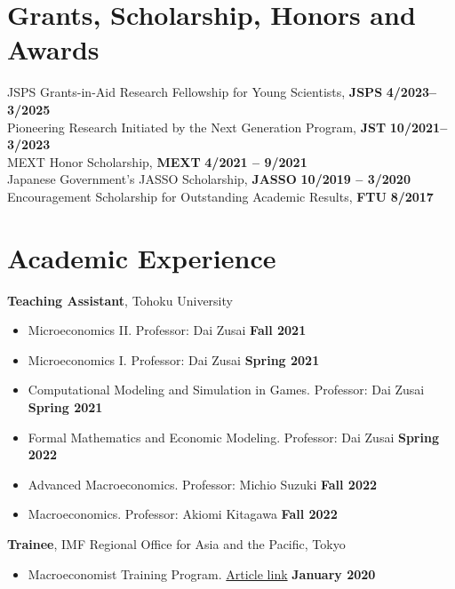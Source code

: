 \documentclass[margin,line]{res}
\begin{document}
\begin{resume}
\section{\sc Grants, Scholarship, Honors and Awards}
JSPS Grants-in-Aid Research Fellowship for Young Scientists, {\bf JSPS} \hfill {\bf 4/2023--3/2025}\\
Pioneering Research Initiated by the Next Generation Program, {\bf JST} \hfill {\bf 10/2021--3/2023}\\
MEXT Honor Scholarship, {\bf MEXT} \hfill {\bf 4/2021 -- 9/2021}\\
Japanese Government's JASSO Scholarship, {\bf JASSO} \hfill {\bf 10/2019 -- 3/2020}\\
Encouragement Scholarship for Outstanding Academic Results, {\bf FTU} \hfill {\bf 8/2017}\\

\vspace{4mm}

\section{\sc Academic Experience}
{\bf Teaching Assistant}, Tohoku University
\begin{itemize}
\item[ ] Microeconomics II. Professor: Dai Zusai \hfill {\bf Fall 2021}
\item[ ] Microeconomics I. Professor: Dai Zusai \hfill {\bf Spring 2021}
\item[ ] Computational Modeling and Simulation in Games. Professor: Dai Zusai \hfill {\bf Spring 2021}
\item[ ] Formal Mathematics and Economic Modeling. Professor: Dai Zusai \hfill {\bf Spring 2022}
\item[ ] Advanced Macroeconomics. Professor: Michio Suzuki \hfill {\bf Fall 2022}
\item[ ] Macroeconomics. Professor: Akiomi Kitagawa \hfill {\bf Fall 2022}
\end{itemize}

\vspace*{.05in}
{\bf Trainee}, IMF Regional Office for Asia and the Pacific, Tokyo
\vspace*{.05in}
\begin{itemize}
\item[ ] Macroeconomist Training Program. \href{https://www.imf.org/en/Countries/ResRep/OAP-Home/~/link.aspx?_id=C2F64E8412B64A86BD37DDEB8439312B&_z=z}{Article link} \hfill {\bf January 2020}
\end{itemize}


\end{resume}
\end{document}
